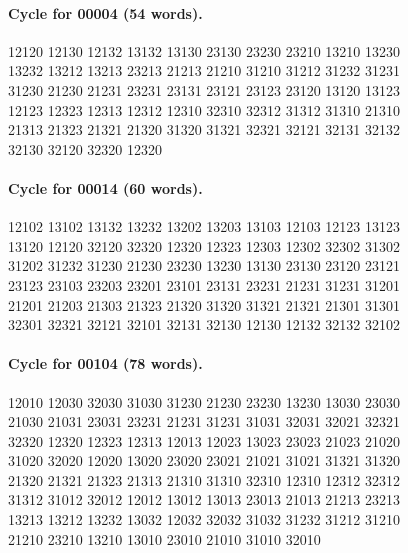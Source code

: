 \documentclass[11pt]{article}
\theoremstyle{remark}
\numberwithin{equation}{section}
\begin{document}
\paragraph{Cycle for 00004 (54 words).}
\begingroup\footnotesize\ttfamily\begin{flushleft}
12120 12130 12132 13132 13130 23130 23230 23210 13210 13230\\
13232 13212 13213 23213 21213 21210 31210 31212 31232 31231\\
31230 21230 21231 23231 23131 23121 23123 23120 13120 13123\\
12123 12323 12313 12312 12310 32310 32312 31312 31310 21310\\
21313 21323 21321 21320 31320 31321 32321 32121 32131 32132\\
32130 32120 32320 12320\\
\end{flushleft}\endgroup
\paragraph{Cycle for 00014 (60 words).}
\begingroup\footnotesize\ttfamily\begin{flushleft}
12102 13102 13132 13232 13202 13203 13103 12103 12123 13123\\
13120 12120 32120 32320 12320 12323 12303 12302 32302 31302\\
31202 31232 31230 21230 23230 13230 13130 23130 23120 23121\\
23123 23103 23203 23201 23101 23131 23231 21231 31231 31201\\
21201 21203 21303 21323 21320 31320 31321 21321 21301 31301\\
32301 32321 32121 32101 32131 32130 12130 12132 32132 32102\\
\end{flushleft}\endgroup
\paragraph{Cycle for 00104 (78 words).}
\begingroup\footnotesize\ttfamily\begin{flushleft}
12010 12030 32030 31030 31230 21230 23230 13230 13030 23030\\
21030 21031 23031 23231 21231 31231 31031 32031 32021 32321\\
32320 12320 12323 12313 12013 12023 13023 23023 21023 21020\\
31020 32020 12020 13020 23020 23021 21021 31021 31321 31320\\
21320 21321 21323 21313 21310 31310 32310 12310 12312 32312\\
31312 31012 32012 12012 13012 13013 23013 21013 21213 23213\\
13213 13212 13232 13032 12032 32032 31032 31232 31212 31210\\
21210 23210 13210 13010 23010 21010 31010 32010\\
\end{flushleft}\endgroup
\end{document}
